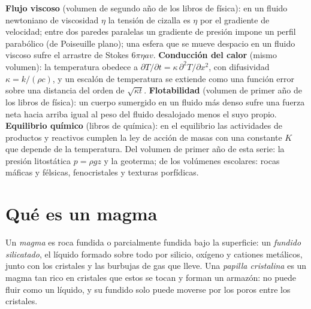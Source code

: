 \begin{recall}
\textbf{Flujo viscoso} (volumen de segundo año de los libros de física): en un fluido newtoniano de
viscosidad $\eta$ la tensión de cizalla es $\eta$ por el gradiente de velocidad; entre
dos paredes paralelas un gradiente de presión impone un perfil parabólico (de Poiseuille
plano); una esfera que se mueve despacio en un fluido viscoso sufre el arrastre de Stokes
$6\pi\eta a v$. \textbf{Conducción del calor} (mismo volumen): la temperatura obedece a
$\partial T/\partial t = \kappa\,\partial^2T/\partial x^2$, con difusividad $\kappa = k/(\rho
c)$, y un escalón de temperatura se extiende como una función error sobre una distancia del
orden de $\sqrt{\kappa t}$. \textbf{Flotabilidad} (volumen de primer año de los libros de física): un cuerpo
sumergido en un fluido más denso sufre una fuerza neta hacia arriba igual al peso del fluido
desalojado menos el suyo propio. \textbf{Equilibrio químico} (libros de química): en el
equilibrio las actividades de productos y reactivos cumplen la ley de acción de
masas con una constante $K$ que depende de la temperatura. Del volumen de primer año
de esta serie: la presión litostática $p = \rho g z$ y la geoterma; de los
volúmenes escolares: rocas máficas y félsicas, fenocristales y texturas porfídicas.
\end{recall}

\section{Qué es un magma}

\begin{definition}[Magma]\label{def:b2:magma-emplacement:magma}
Un \emph{magma} es roca fundida o parcialmente fundida bajo la superficie: un
\emph{fundido silicatado}, el líquido formado sobre todo por silicio,
oxígeno y cationes metálicos, junto con los cristales y las burbujas de gas que lleve.
Una \emph{papilla cristalina} es un magma tan rico en cristales que estos
se tocan y forman un armazón: no puede fluir como un líquido, y su fundido solo puede
moverse por los poros entre los cristales.
\end{definition}

